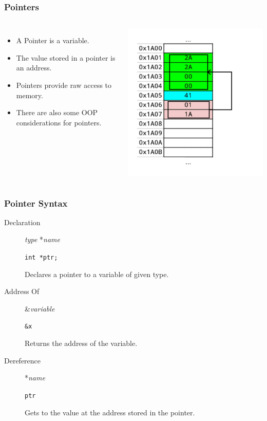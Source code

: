 \documentclass{beamer}
\begin{document}
\begin{frame}
    \frametitle{Pointers}
    \begin{columns}
        \begin{itemize}
            \item A Pointer is a variable.
            \item The value stored in a pointer is an address.
            \item Pointers provide raw access to memory.
            \item There are also some OOP considerations for pointers.
        \end{itemize}
        \includegraphics[height=0.60\textheight]{images/memptr}
    \end{columns}
\end{frame}

\begin{frame}
    \frametitle{Pointer Syntax}
    \begin{description}
        \item[Declaration]   {\em type} *{\em name}
            \par {\tt int *ptr;}
            \par Declares a pointer to a variable of given type.
        \item[Address Of]  \&{\em variable}
            \par {\tt \&x}
            \par Returns the address of the variable.
        \item[Dereference] *{\em name}
            \par {\tt *ptr}
            \par Gets to the value at the address stored in the pointer.
    \end{description}
\end{frame}
\end{document}
